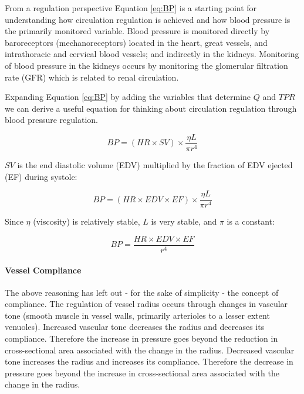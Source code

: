 From a regulation perspective Equation \ref{eq:BP} is a starting point for understanding how circulation regulation is achieved and how blood pressure is the primarily monitored variable. Blood pressure is monitored directly by baroreceptors (mechanoreceptors) located in the heart, great vessels, and intrathoracic and cervical blood vessels; and indirectly in the kidneys. Monitoring of blood pressure in the kidneys occurs by monitoring the glomerular filtration rate (GFR) which is related to renal circulation. 

Expanding Equation \ref{eq:BP} by adding the variables that determine $\dot{Q}$ and $TPR$ we can derive a useful equation for thinking about circulation regulation through blood pressure regulation.

\begin{equation}
    BP = (HR \times SV) \times \frac{\eta L}{\pi r^4}
    \label{eq:BP_expanded}
\end{equation}

$SV$ is the end diastolic volume (EDV) multiplied by the fraction of EDV ejected (EF) during systole:

\begin{equation}
    BP = (HR \times EDV \times EF) \times \frac{\eta L}{\pi r^4}
    \label{eq:BP_P}
\end{equation}

Since $\eta$ (viscosity) is relatively stable, $L$ is very stable, and $\pi$ is a constant:

\begin{equation}
    BP = \frac{HR \times EDV \times EF}{r^4} 
    \label{eq:BP_simplified}
\end{equation}

\paragraph{Vessel Compliance}

The above reasoning has left out - for the sake of simplicity - the concept of compliance. The regulation of vessel radius occurs through changes in vascular tone (smooth muscle in vessel walls, primarily arterioles to a lesser extent venuoles). Increased vascular tone decreases the radius and decreases its compliance. Therefore the increase in pressure goes beyond the reduction in cross-sectional area associated with the change in the radius. Decreased vascular tone increases the radius and increases its compliance. Therefore the decrease in pressure goes beyond the increase in cross-sectional area associated with the change in the radius. 

